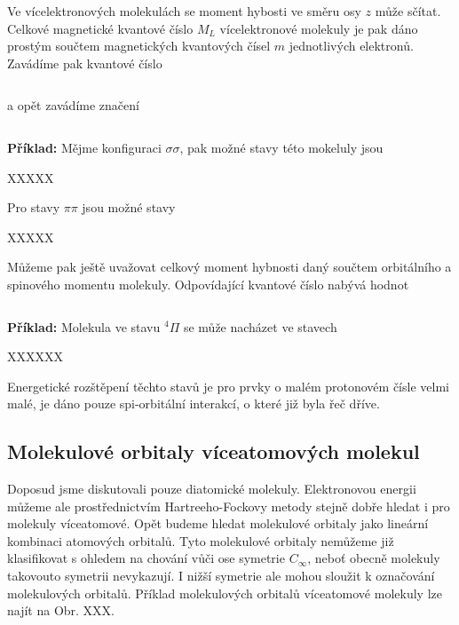 Ve vícelektronových molekulách se moment hybosti ve směru osy $z$ může sčítat. Celkové magnetické kvantové číslo $M_L$ vícelektronové molekuly je pak dáno prostým součtem magnetických kvantových čísel $m$ jednotlivých elektronů. Zavádíme pak kvantové číslo 

\begin{equation}
\label{rov:XXX}
\end{equation}   
       
\noindent a opět zavádíme značení

\begin{equation}
\label{rov:XXX}
\end{equation}


\textbf{Příklad:} Mějme konfiguraci $\sigma\sigma$, pak možné stavy této mokeluly jsou 

\bigskip
XXXXX
\bigskip

Pro stavy $\pi\pi$ jsou možné stavy 

\bigskip
XXXXX
\bigskip


Můžeme pak ještě uvažovat celkový moment hybnosti daný součtem orbitálního a spinového momentu molekuly. Odpovídající kvantové číslo nabývá hodnot

\begin{equation}
\label{rov:XXX}
\end{equation}

\textbf{Příklad:} Molekula ve stavu $^4\Pi$ se může nacházet ve stavech 

\bigskip
XXXXXX
\bigskip


Energetické rozštěpení těchto stavů je pro prvky o malém protonovém čísle velmi malé, je dáno pouze spi-orbitální interakcí, o které již byla řeč dříve. 


\subsection{Molekulové orbitaly víceatomových molekul}
Doposud jsme diskutovali pouze diatomické molekuly. Elektronovou energii můžeme ale prostřednictvím Hartreeho-Fockovy metody stejně dobře hledat i pro molekuly víceatomové. Opět budeme hledat molekulové orbitaly jako lineární kombinaci atomových orbitalů. Tyto molekulové orbitaly nemůžeme již klasifikovat s ohledem na chování vůči ose symetrie $C_\infty$, neboť obecně molekuly takovouto symetrii nevykazují. I nižší symetrie ale mohou sloužit k označování molekulových orbitalů. Příklad molekulových orbitalů víceatomové molekuly lze najít na Obr. XXX.

